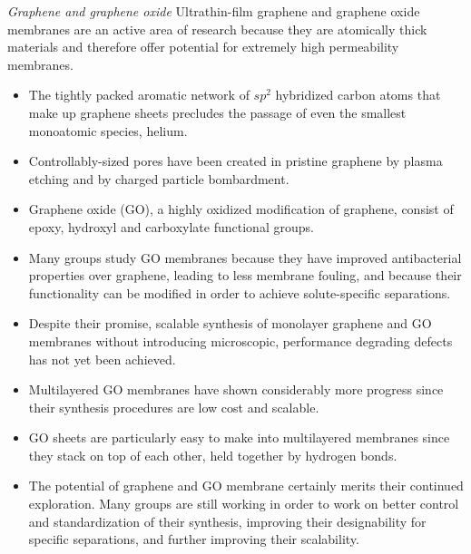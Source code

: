   \textit{Graphene and graphene oxide} Ultrathin-film graphene and graphene oxide membranes
  are an active area of research because they are atomically thick materials and therefore 
  offer potential for extremely high permeability membranes.~\cite{humplik_nanostructured_2011} 
  \begin{itemize}
    \item The tightly packed aromatic network of $sp^2$ hybridized carbon atoms that 
    make up graphene sheets precludes the passage of even the smallest monoatomic species, helium.~\cite{bunch_impermeable_2008}
    \item Controllably-sized pores have been created in pristine graphene by plasma etching
    and by charged particle bombardment.~\cite{surwade_water_2015,russo_atom-by-atom_2012}
    \item Graphene oxide (GO), a highly oxidized modification of graphene, consist of epoxy,
    hydroxyl and carboxylate functional groups.~\cite{hegab_graphene_2015}
    \item Many groups study GO membranes because they have improved antibacterial properties 
    over graphene, leading to less membrane fouling, and because their functionality can be
    modified in order to achieve solute-specific separations.~\cite{liu_antibacterial_2011,he_bioinspired_2013}
    \item Despite their promise, scalable synthesis of monolayer graphene and GO membranes without
    introducing microscopic, performance degrading defects has not yet been achieved.~\cite{cohen-tanugi_multilayer_2016,wei_multilayered_2018}
    \item Multilayered GO membranes have shown considerably more progress since their 
    synthesis procedures are low cost and scalable.~\cite{zhang_size-controlled_2009}
    \item GO sheets are particularly easy to make into multilayered membranes since they 
    stack on top of each other, held together by hydrogen bonds.~\cite{homaeigohar_graphene_2017}
    \item The potential of graphene and GO membrane certainly merits their continued exploration. Many
    groups are still working in order to work on better control and standardization of their synthesis,
    improving their designability for specific separations, and further improving their scalability.~\cite{wei_multilayered_2018}
  \end{itemize}    
  
